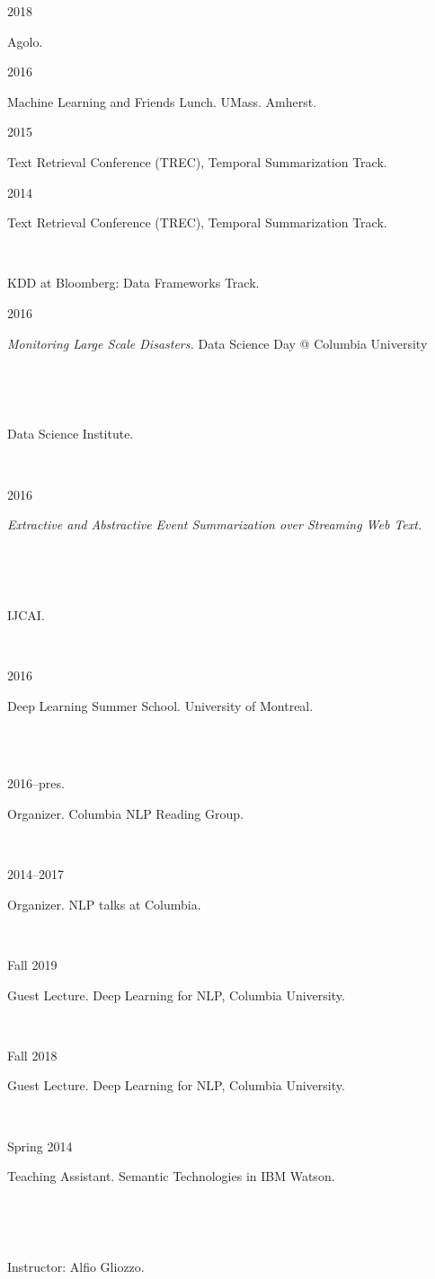 \documentclass{scrartcl}
\newcommand{\MarginSection}[1]{\marginpar{#1}}
\begin{document}
\begin{cv}{}
\noindent \parbox{6em}{2018} Agolo.
            
\noindent \parbox{6em}{2016} Machine Learning and Friends Lunch. UMass. Amherst.

\noindent \parbox{6em}{2015} Text Retrieval Conference (TREC), Temporal Summarization Track.

\noindent \parbox{6em}{2014} Text Retrieval Conference (TREC), Temporal Summarization Track.

\noindent \parbox{6em}{~} KDD at Bloomberg: Data Frameworks Track.\\


\MarginSection{~\\Demos}


{\noindent\parbox{6em}{2016}  \textit{Monitoring Large Scale Disasters.} Data Science Day @ Columbia University} \\
 {\noindent\parbox{6em}{~~~~} \noindent  Data Science Institute.} \\

\MarginSection{~\\Doctoral\\Consortium}


{\noindent\parbox{6em}{2016}  \textit{Extractive and Abstractive Event Summarization over Streaming Web Text.}} \\
 {\noindent\parbox{6em}{~~~~} \noindent  IJCAI.}

~\\

\MarginSection{~\\Summer\\Schools}

{\noindent\parbox{6em}{2016}  Deep Learning Summer School. University of Montreal.} \\ ~\\


\MarginSection{~\\Community\\Service}

{\noindent\parbox{6em}{2016--pres.}  Organizer. Columbia NLP Reading Group.} \\
{\noindent\parbox{6em}{2014--2017}  Organizer. NLP talks at Columbia.} \\
 

\MarginSection{~\\Teaching\\Experience}
{\noindent\parbox{6em}{Fall 2019}  Guest Lecture. Deep Learning for NLP, Columbia University.}\\
{\noindent\parbox{6em}{Fall 2018}  Guest Lecture. Deep Learning for NLP, Columbia University.}\\
{\noindent\parbox{6em}{Spring 2014}  Teaching Assistant. Semantic Technologies in IBM Watson.}\\
{\noindent\parbox{6em}{~~~~~~~~~~~}  Instructor: Alfio Gliozzo.}


~\\ ~\\

\date{}

\end{cv}
\end{document}
